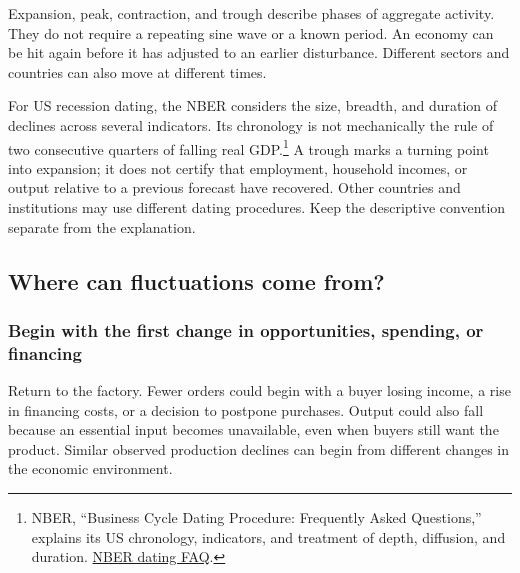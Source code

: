 Expansion, peak, contraction, and trough describe phases of aggregate
activity. They do not require a repeating sine wave or a known period.
An economy can be hit again before it has adjusted to an earlier disturbance.
Different sectors and countries can also move at different times.

For US recession dating, the NBER considers the size, breadth, and duration
of declines across several indicators. Its chronology is not mechanically
the rule of two consecutive quarters of falling real GDP.\footnote{NBER,
``Business Cycle Dating Procedure: Frequently Asked Questions,'' explains
its US chronology, indicators, and treatment of depth, diffusion, and duration.
\href{https://www.nber.org/research/business-cycle-dating/business-cycle-dating-procedure-frequently-asked-questions}{NBER dating FAQ}.}
A trough marks a turning point into expansion; it does not certify that
employment, household incomes, or output relative to a previous forecast
have recovered. Other countries and institutions may use different dating
procedures. Keep the descriptive convention separate from the explanation.

\subsection{Where can fluctuations come from?}

\subsubsection{Begin with the first change in opportunities, spending, or financing}

Return to the factory. Fewer orders could begin with a buyer losing income,
a rise in financing costs, or a decision to postpone purchases. Output could
also fall because an essential input becomes unavailable, even when buyers
still want the product. Similar observed production declines can begin from
different changes in the economic environment.

